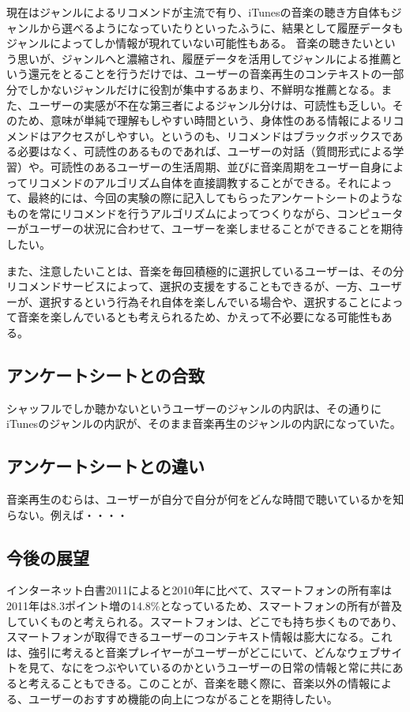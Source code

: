 \documentclass[11pt, twocolumn]{jsarticle}
\begin{document}
現在はジャンルによるリコメンドが主流で有り、iTunesの音楽の聴き方自体もジャンルから選べるようになっていたりといったふうに、結果として履歴データもジャンルによってしか情報が現れていない可能性もある。
音楽の聴きたいという思いが、ジャンルへと濃縮され、履歴データを活用してジャンルによる推薦という還元をとることを行うだけでは、ユーザーの音楽再生のコンテキストの一部分でしかないジャンルだけに役割が集中するあまり、不鮮明な推薦となる。また、ユーザーの実感が不在な第三者によるジャンル分けは、可読性も乏しい。そのため、意味が単純で理解もしやすい時間という、身体性のある情報によるリコメンドはアクセスがしやすい。というのも、リコメンドはブラックボックスである必要はなく、可読性のあるものであれば、ユーザーの対話（質問形式による学習）や。可読性のあるユーザーの生活周期、並びに音楽周期をユーザー自身によってリコメンドのアルゴリズム自体を直接調教することができる。それによって、最終的には、今回の実験の際に記入してもらったアンケートシートのようなものを常にリコメンドを行うアルゴリズムによってつくりながら、コンピューターがユーザーの状況に合わせて、ユーザーを楽しませることができることを期待したい。

また、注意したいことは、音楽を毎回積極的に選択しているユーザーは、その分リコメンドサービスによって、選択の支援をすることもできるが、一方、ユーザーが、選択するという行為それ自体を楽しんでいる場合や、選択することによって音楽を楽しんでいるとも考えられるため、かえって不必要になる可能性もある。




\subsection{アンケートシートとの合致}
シャッフルでしか聴かないというユーザーのジャンルの内訳は、その通りにiTunesのジャンルの内訳が、そのまま音楽再生のジャンルの内訳になっていた。

\subsection{アンケートシートとの違い}
音楽再生のむらは、ユーザーが自分で自分が何をどんな時間で聴いているかを知らない。例えば・・・・


\subsection{今後の展望}
インターネット白書2011によると2010年に比べて、スマートフォンの所有率は2011年は8.3ポイント増の14.8\%となっているため、スマートフォンの所有が普及していくものと考えられる。スマートフォンは、どこでも持ち歩くものであり、スマートフォンが取得できるユーザーのコンテキスト情報は膨大になる。これは、強引に考えると音楽プレイヤーがユーザーがどこにいて、どんなウェブサイトを見て、なにをつぶやいているのかというユーザーの日常の情報と常に共にあると考えることもできる。このことが、音楽を聴く際に、音楽以外の情報による、ユーザーのおすすめ機能の向上につながることを期待したい。
\end{document}
